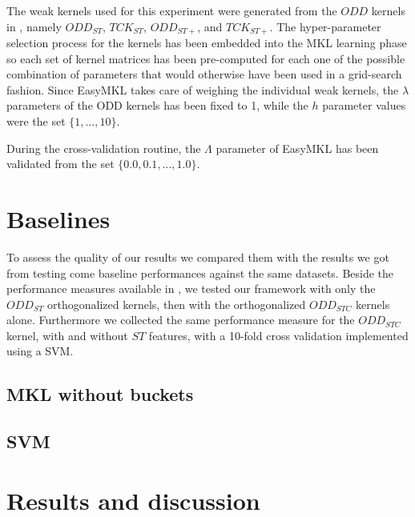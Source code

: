 The weak kernels used for this experiment were generated from the $ODD$ kernels
in \cite{rtesselli}, namely $ODD_{ST}$, $TCK_{ST}$, $ODD_{ST+}$, and $TCK_{ST+}$.
The hyper-parameter selection process for the kernels has been embedded
into the MKL learning phase so each set of kernel matrices has been
pre-computed for each one of the possible combination of parameters that would
otherwise have been used in a grid-search fashion.
Since EasyMKL takes care of weighing the individual weak kernels, the $\lambda$
parameters of the ODD kernels has been fixed to 1, while the $h$ parameter
values were the set $\{1,\dots,10\}$.

During the cross-validation routine, the $\Lambda$ parameter of EasyMKL has been
validated from the set $\{0.0, 0.1,\dots,1.0\}$.

\section{Baselines}
To assess the quality of our results we compared them with the results we got
from testing come baseline performances against the same datasets.
Beside the performance measures available in \cite{gmkl}, we tested our framework
with only the $ODD_{ST}$ orthogonalized kernels, then with the orthogonalized
$ODD_{STC}$ kernels alone.
Furthermore we collected the same performance measure for the $ODD_{STC}$ kernel,
with and without $ST$ features, with a 10-fold cross validation implemented
using a SVM.

\subsection{MKL without buckets}

\subsection{SVM}

\section{Results and discussion}
\label{subsec:results}

